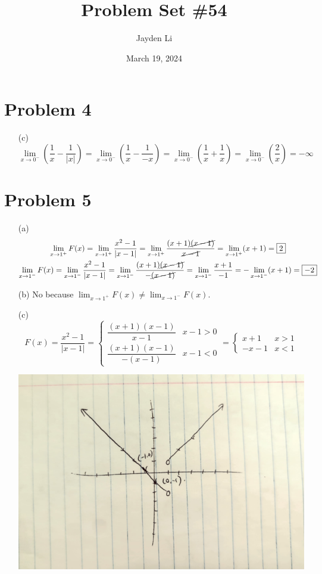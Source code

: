 \documentclass{article}
\title{Problem Set \#54}
\author{Jayden Li}
\date{March 19, 2024}
\newcommand{\problem}[1]{\section*{Problem #1}}
\begin{document}
\fontsize{12pt}{12pt}\selectfont
\setlength{\abovedisplayskip}{0pt}
\maketitle

\problem{4}
\begin{itemize}
	\item[(c)]
	\begin{equation*}
		\lim_{x\to0^-}\left({\frac{1}{x}-\frac{1}{|x|}}\right)
		=\lim_{x\to0^-}\left(\frac{1}{x}-\frac{1}{-x}\right)
		=\lim_{x\to0^-}\left(\frac{1}{x}+\frac{1}{x}\right)
		=\lim_{x\to0^-}\left(\frac{2}{x}\right)
		=\boxed{-\infty}
	\end{equation*}
\end{itemize}

\problem{5}
\begin{itemize}
	\item[(a)]
	\begin{gather*}
		\lim_{x\to1^+}F(x)=\lim_{x\to1^+}\frac{x^2-1}{|x-1|}
		=\lim_{x\to1^+}\frac{(x+1)\cancel{(x-1)}}{\cancel{x-1}}
		=\lim_{x\to1^+}(x+1)=\boxed{2} \\
		\lim_{x\to1^-}F(x)=\lim_{x\to1^-}\frac{x^2-1}{|x-1|}
		=\lim_{x\to1^-}\frac{(x+1)\cancel{(x-1)}}{-\cancel{(x-1)}}
		=\lim_{x\to1^-}\frac{x+1}{-1}
		=-\lim_{x\to1^-}(x+1)
		=\boxed{-2}
	\end{gather*}

	\item[(b)]
	No because \(\displaystyle \lim_{x\to1^+}F(x)\neq\lim_{x\to1^-}F(x)\).

	\item[(c)]
	\begin{equation*}
		F(x)=\frac{x^2-1}{|x-1|}
		=\begin{cases}
			\dfrac{(x+1)(x-1)}{x-1} & x-1>0 \\
			\dfrac{(x+1)(x-1)}{-(x-1)} & x-1<0
		\end{cases}
		=\begin{cases}
			x+1 & x>1 \\
			-x-1 & x<1
		\end{cases}
	\end{equation*}
	
	\begin{center}
		\centering
		\includegraphics*[width=0.65\linewidth]{q5c.png}
	\end{center}
\end{itemize}
\end{document}
